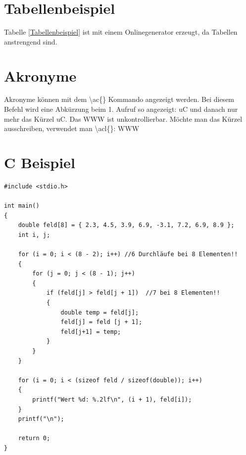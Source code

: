 \section{Tabellenbeispiel}
\label{sec:tabelle}

Tabelle \ref{Tabellenbeispiel} ist mit einem Onlinegenerator erzeugt, da Tabellen anstrengend sind.

\begin{table}[H]
\caption{Tabellenbeispiel}
\label{Tabellenbeispiel}
\end{table}

\section{Akronyme}
\label{sec:akronyme}
Akronyme können mit dem \textbackslash{}ac\{\} Kommando angezeigt werden. Bei diesem Befehl wird eine Abkürzung beim 1. Aufruf so angezeigt: \ac{uC} und danach nur mehr das Kürzel \ac{uC}. Das \ac{WWW} ist unkontrollierbar. Möchte man das Kürzel ausschreiben, verwendet man \textbackslash{}acl\{\}: \acl{WWW}

\section{C Beispiel}
\label{sec:c-beispiel}

\begin{lstlisting}[style=C,caption=C Codebeispiel,label=cCode]
#include <stdio.h>

int main()
{
    double feld[8] = { 2.3, 4.5, 3.9, 6.9, -3.1, 7.2, 6.9, 8.9 };
    int i, j;
    
    for (i = 0; i < (8 - 2); i++) //6 Durchläufe bei 8 Elementen!!
    {  
        for (j = 0; j < (8 - 1); j++)
        {
            if (feld[j] > feld[j + 1])  //7 bei 8 Elementen!!
            {
                double temp = feld[j];
                feld[j] = feld [j + 1];
                feld[j+1] = temp;
            }
        }
    }
    
    for (i = 0; i < (sizeof feld / sizeof(double)); i++)
    {
        printf("Wert %d: %.2lf\n", (i + 1), feld[i]);
    }
    printf("\n");
    
    return 0;
}

\end{lstlisting}
\newpage